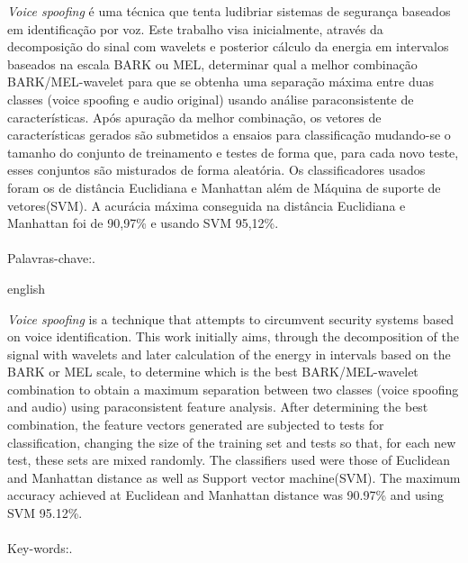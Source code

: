\begin{resumo}
	\par \textit{Voice spoofing} é uma técnica que tenta ludibriar sistemas de segurança baseados em identificação por voz. Este trabalho visa inicialmente, através da decomposição do sinal com wavelets e posterior cálculo da energia em intervalos baseados na escala BARK ou MEL, determinar qual a melhor combinação BARK/MEL-wavelet para que se obtenha uma separação máxima entre duas classes (voice spoofing e audio original) usando análise paraconsistente de características. Após apuração da melhor combinação, os vetores de características gerados são submetidos a ensaios para classificação mudando-se o tamanho do conjunto de treinamento e testes de forma que, para cada novo teste, esses conjuntos são misturados de forma aleatória. Os classificadores usados foram os de distância Euclidiana e Manhattan além de Máquina de suporte de vetores(SVM). A acurácia máxima conseguida na distância Euclidiana e Manhattan foi de 90,97\% e usando SVM 95,12\%.\\\\
	Palavras-chave:\ptBRkeyWords.
\end{resumo}

\begin{resumo}[Abstract]
	\begin{otherlanguage*}{english}
		\par \textit{Voice spoofing} is a technique that attempts to circumvent security systems based on voice identification. This work initially aims, through the decomposition of the signal with wavelets and later calculation of the energy in intervals based on the BARK or MEL scale, to determine which is the best BARK/MEL-wavelet combination to obtain a maximum separation between two classes (voice spoofing and audio) using paraconsistent feature analysis. After determining the best combination, the feature vectors generated are subjected to tests for classification, changing the size of the training set and tests so that, for each new test, these sets are mixed randomly. The classifiers used were those of Euclidean and Manhattan distance as well as Support vector machine(SVM). The maximum accuracy achieved at Euclidean and Manhattan distance was 90.97\% and using SVM 95.12\%.\\\\
		Key-words:\enUSkeyWords .
	 \end{otherlanguage*}
\end{resumo}






